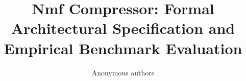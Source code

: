 \title{\textbf{Nmf Compressor: Formal Architectural Specification and Empirical Benchmark Evaluation}}

\author{Anonymous authors}
